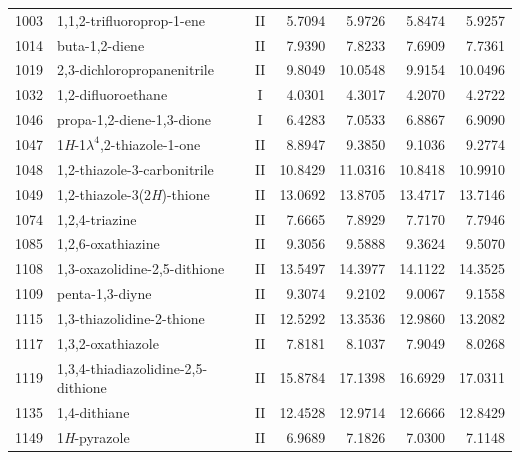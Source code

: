 \begin{longtable}{rlcd{2.5}d{2.5}d{2.5}d{2.5}}
    1003 & 1,1,2-trifluoroprop-1-ene                              & II & 5.7094  & 5.9726  & 5.8474  & 5.9257  \\
    1014 & buta-1,2-diene                                         & II & 7.9390  & 7.8233  & 7.6909  & 7.7361  \\
    1019 & 2,3-dichloropropanenitrile                             & II & 9.8049  & 10.0548 & 9.9154  & 10.0496 \\
    1032 & 1,2-difluoroethane                                     & I  & 4.0301  & 4.3017  & 4.2070  & 4.2722  \\
    1046 & propa-1,2-diene-1,3-dione                              & I  & 6.4283  & 7.0533  & 6.8867  & 6.9090  \\
    1047 & 1\textit{H}-1$\lambda^4$,2-thiazole-1-one              & II & 8.8947  & 9.3850  & 9.1036  & 9.2774  \\
    1048 & 1,2-thiazole-3-carbonitrile                            & II & 10.8429 & 11.0316 & 10.8418 & 10.9910 \\
    1049 & 1,2-thiazole-3(2\textit{H})-thione                     & II & 13.0692 & 13.8705 & 13.4717 & 13.7146 \\
    1074 & 1,2,4-triazine                                         & II & 7.6665  & 7.8929  & 7.7170  & 7.7946  \\
    1085 & 1,2,6-oxathiazine                                      & II & 9.3056  & 9.5888  & 9.3624  & 9.5070  \\
    1108 & 1,3-oxazolidine-2,5-dithione                           & II & 13.5497 & 14.3977 & 14.1122 & 14.3525 \\
    1109 & penta-1,3-diyne                                        & II & 9.3074  & 9.2102  & 9.0067  & 9.1558  \\
    1115 & 1,3-thiazolidine-2-thione                              & II & 12.5292 & 13.3536 & 12.9860 & 13.2082 \\
    1117 & 1,3,2-oxathiazole                                      & II & 7.8181  & 8.1037  & 7.9049  & 8.0268  \\
    1119 & 1,3,4-thiadiazolidine-2,5-dithione                     & II & 15.8784 & 17.1398 & 16.6929 & 17.0311 \\
    1135 & 1,4-dithiane                                           & II & 12.4528 & 12.9714 & 12.6666 & 12.8429 \\
    1149 & 1\textit{H}-pyrazole                                   & II & 6.9689  & 7.1826  & 7.0300  & 7.1148  \\

\end{longtable}
